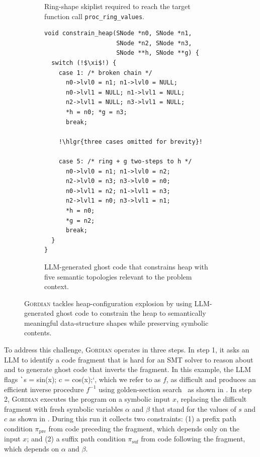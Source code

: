 \documentclass[acmsmall,screen,nonacm]{acmart}
\newcommand{\projName}{\textsc{Gordian}\xspace}
\theoremstyle{definition}
\begin{document}
\begin{figure}
\begin{subfigure}[b]{0.28\textwidth}
{
}
    \caption{Ring-shape skiplist required to reach the target function call \texttt{proc\_ring\_values}.}
    \label{fig:ring}
  \end{subfigure}
  \hfill
  \begin{subfigure}[b]{0.36\textwidth}
    \centering
{
\tiny          
\begin{verbatim}
void constrain_heap(SNode *n0, SNode *n1,
                    SNode *n2, SNode *n3,
                    SNode **h, SNode **g) {
  switch (!$\xi$!) {
    case 1: /* broken chain */
      n0->lvl0 = n1; n1->lvl0 = NULL;
      n0->lvl1 = NULL; n1->lvl1 = NULL;
      n2->lvl1 = NULL; n3->lvl1 = NULL;
      *h = n0; *g = n3;
      break;

    !\hlgr{three cases omitted for brevity}!

    case 5: /* ring + g two-steps to h */
      n0->lvl0 = n1; n1->lvl0 = n2;
      n2->lvl0 = n3; n3->lvl0 = n0;
      n0->lvl1 = n2; n1->lvl1 = n3;
      n2->lvl1 = n0; n3->lvl1 = n1;
      *h = n0;
      *g = n2;
      break;
  }
}
\end{verbatim}
}
    \caption{LLM-generated ghost code that constrains heap with five semantic topologies relevant to the problem context.}
    \label{fig:constrain_heap}
  \end{subfigure}
  \vspace{-2mm}
  \caption{\projName tackles heap-configuration explosion by using LLM-generated ghost code to constrain the heap to semantically meaningful data-structure shapes while preserving symbolic contents.}
  \label{fig:topology_example}
  \vspace{-2mm}  
\end{figure}

To address this challenge, \projName operates in three steps. In step 1, it asks an LLM to identify a code fragment that is hard for an SMT solver to reason about and to generate ghost code that inverts the fragment. In this example, the LLM flags \texttt`s = sin(x); c = cos(x);`, which we refer to as $f$, as difficult and produces an efficient inverse procedure \(f^{-1}\) using golden-section search~\cite{kiefer1953sequential} as shown in . In step 2, \projName executes the program on a symbolic input \(x\), replacing the difficult fragment with fresh symbolic variables \(\alpha\) and \(\beta\) that stand for the values of \(s\) and \(c\) as shown in . During this run it collects two constraints: (1) a prefix path condition \(\pi_{\mathrm{pre}}\) from code preceding the fragment, which depends only on the input \(x\); and (2) a suffix path condition \(\pi_{\mathrm{suf}}\) from code following the fragment, which depends on \(\alpha\) and \(\beta\).
\end{document}
